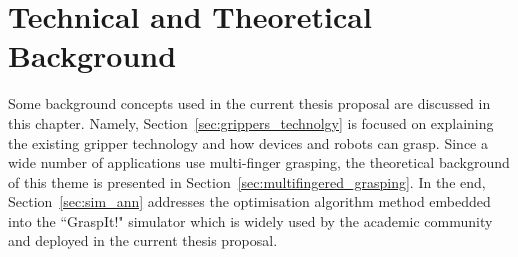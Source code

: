 \chapter{Technical and Theoretical Background}
\label{cap2a:background}

Some background concepts used in the current thesis proposal are discussed in this chapter. Namely, Section~\ref{sec:grippers_technolgy} is focused on explaining the existing gripper technology and how devices and robots can grasp. Since a wide number of applications use multi-finger grasping, the theoretical background of this theme is presented in Section~\ref{sec:multifingered_grasping}. In the end, Section~\ref{sec:sim_ann} addresses the optimisation algorithm method embedded into the ``GraspIt!" simulator which is widely used by the academic community and deployed in the current thesis proposal.  




